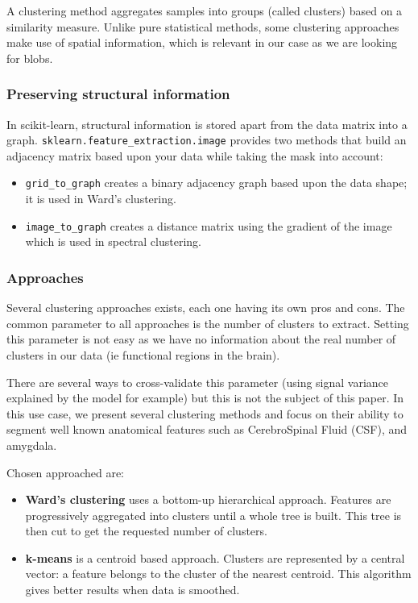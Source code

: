 \documentclass{frontiersSCNS} %
\newcounter{x}
\newcounter{y}
\newcounter{z}
\begin{document}
A clustering method aggregates samples into groups (called clusters) based on a similarity
measure. Unlike pure statistical methods, some clustering approaches make use of
spatial information, which is relevant in our case as we are looking for blobs.

\subsubsection{Preserving structural information}

In scikit-learn, structural information is stored apart from the data matrix
into a graph. \verb!sklearn.feature_extraction.image! provides two methods
that build an adjacency matrix based upon your data while taking the mask
into account:
\begin{itemize}
    \item \verb!grid_to_graph! creates a binary adjacency graph based upon the
        data shape; it is used in Ward's clustering.
    \item \verb!image_to_graph! creates a distance matrix using the gradient of
        the image which is used in spectral clustering.
\end{itemize}

\subsubsection{Approaches}

Several clustering approaches exists, each one having its own pros and cons.
The common parameter to all approaches is the number of clusters to extract.
Setting this parameter is not easy as we have no information about the real
number of clusters in our data (ie functional regions in the brain).

There are several ways to cross-validate this parameter (using signal variance
explained by the model for example) but this is not the subject of this paper.
In this use case, we present several clustering methods and focus on their
ability to segment well known anatomical features such as CerebroSpinal Fluid
(CSF), and amygdala.

Chosen approached are:
\begin{itemize}
    \item{\bf Ward's clustering} uses a bottom-up hierarchical approach. Features are
        progressively aggregated into clusters until a whole tree is built. This
        tree is then cut to get the requested number of clusters.
    \item{\bf k-means} is a centroid based approach. Clusters are represented by
        a central vector: a feature belongs to the cluster of the nearest
        centroid. This algorithm gives better results when data is smoothed.
\end{itemize}
\end{document}
